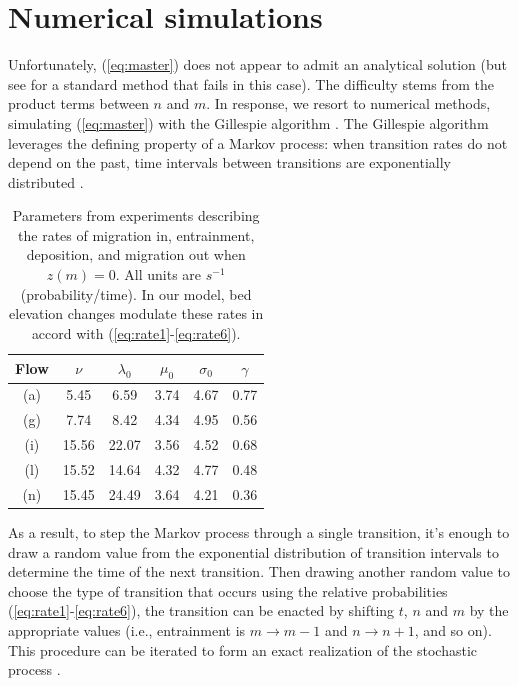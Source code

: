 \documentclass[draft]{agujournal2018}
\begin{document}
\section{Numerical simulations}

Unfortunately, (\ref{eq:master}) does not appear to admit an analytical solution (but see \citet{Swift2002} for a standard method that fails in this case).
The difficulty stems from the product terms between $n$ and $m$.
In response, we resort to numerical methods, simulating (\ref{eq:master}) with the Gillespie algorithm \citep{Gillespie1977, Gillespie1992, Gillespie2007}.
The Gillespie algorithm leverages the defining property of a Markov process: when transition rates do not depend on the past, time intervals between transitions are exponentially distributed \citep[e.g.][]{Cox1965}.



\begin{table}
	\caption{Parameters from \citet{Ancey2008} experiments describing the rates of migration in, entrainment, deposition, and migration out when $z(m)=0$. All units are $s^{-1}$ (probability/time). In our model, bed elevation changes modulate these rates in accord with (\ref{eq:rate1}-\ref{eq:rate6}).}\label{tab:anceyparams}
	\begin{tabular}{cccccc} \\ 
		\toprule  
		Flow & $\nu$ & $\lambda_0$ & $\mu_0$ & $\sigma_0$ & $\gamma$ \\
		\midrule
		(a) & 5.45  & 6.59  & 3.74 & 4.67 & 0.77 \\
		\midrule
		(g) & 7.74  & 8.42  & 4.34 & 4.95 & 0.56 \\
		\midrule
		(i) & 15.56 & 22.07 & 3.56 & 4.52 & 0.68 \\
		\midrule
		(l) & 15.52 & 14.64 & 4.32 & 4.77 & 0.48 \\
		\midrule
		(n) & 15.45 & 24.49 & 3.64 & 4.21 & 0.36 \\
		\bottomrule
	\end{tabular}
\end{table} 

As a result, to step the Markov process through a single transition, it's enough to draw a random value from the exponential distribution of transition intervals to determine the time of the next transition.
Then drawing another random value to choose the type of transition that occurs using the relative probabilities (\ref{eq:rate1}-\ref{eq:rate6}), the transition can be enacted by shifting $t$, $n$ and $m$ by the appropriate values (i.e., entrainment is $m\rightarrow m-1$ and $n \rightarrow n+1$, and so on).
This procedure can be iterated to form an exact realization of the stochastic process \citep[e.g.][]{Gillespie2007}.
\end{document}
